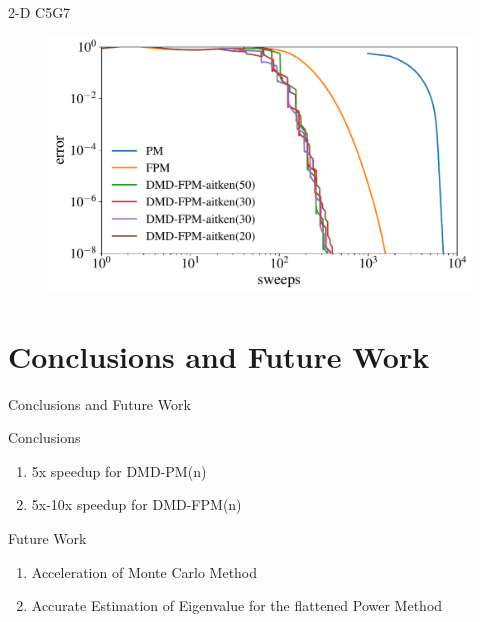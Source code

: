 \documentclass[fleqn]{beamer}
\begin{document}
\begin{frame}{2-D C5G7}
    \begin{figure}
        \centering
        \includegraphics[height=0.65\paperheight]{figures/dmd_ospi_loglog_c5g7_new.pdf}
    \end{figure}
\end{frame}

\section{Conclusions and Future Work}
\begin{frame}{Conclusions and Future Work}
    \begin{block}{Conclusions}
        \begin{enumerate}
            \item 5x speedup for DMD-PM(n)
            \item 5x-10x speedup for DMD-FPM(n)
        \end{enumerate}
    \end{block}
    \begin{block}{Future Work}
        \begin{enumerate}
            \item Acceleration of Monte Carlo Method 
            \item Accurate Estimation of Eigenvalue for the flattened Power Method 
        \end{enumerate}
    \end{block}
\end{frame}  
\end{document}
